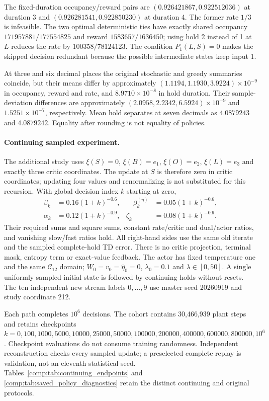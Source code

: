 \documentclass[11pt]{article}
\newcommand{\1}{\mathbf{1}}
\begin{document}
The fixed-duration occupancy/reward pairs are $(0.926421867,0.922512036)$ at duration 3 and $(0.926281541,0.922850230)$ at duration 4. The former rate $1/3$ is infeasible. The two optimal deterministic ties have exactly shared occupancy $171957881/177554825$ and reward $1583657/1636450$; using hold 2 instead of 1 at $L$ reduces the rate by $100358/78124123$. The condition $P_1(L,S)=0$ makes the skipped decision redundant because the possible intermediate states keep input 1.

At three and six decimal places the original stochastic and greedy summaries coincide, but their means differ by approximately $(1.1194,1.1930,3.9224)\times10^{-9}$ in occupancy, reward and rate, and $8.9710\times10^{-8}$ in hold duration. Their sample-deviation differences are approximately $(2.0958,2.2342,6.5924)\times10^{-9}$ and $1.5251\times10^{-7}$, respectively. Mean hold separates at seven decimals as $4.0879243$ and $4.0879242$. Equality after rounding is not equality of policies.

\paragraph{Continuing sampled experiment.}
The additional study uses $\xi(S)=0$, $\xi(B)=e_1$, $\xi(O)=e_2$, $\xi(L)=e_3$ and exactly three critic coordinates. The update at $S$ is therefore zero in critic coordinates; updating four values and renormalizing is not substituted for this recursion. With global decision index $k$ starting at zero,
\[
 \begin{aligned}
 \beta_k&=0.16(1+k)^{-0.6},&\quad \beta_k^{(\eta)}&=0.05(1+k)^{-0.6},\\
 \alpha_k&=0.12(1+k)^{-0.9},& \zeta_k&=0.08(1+k)^{-0.9}.
 \end{aligned}
\]
Their required sums and square sums, constant rate/critic and dual/actor ratios, and vanishing slow/fast ratios hold. All right-hand sides use the same old iterate and the sampled complete-hold TD error. There is no critic projection, terminal mask, entropy term or exact-value feedback. The actor has fixed temperature one and the same $\mathcal C_{12}$ domain; $W_0=v_0=\hat\eta_0=0$, $\lambda_0=0.1$ and $\lambda\in[0,50]$. A single uniformly sampled initial state is followed by continuing holds without resets. The ten independent new stream labels $0,\ldots,9$ use master seed 20260919 and study coordinate 212.

Each path completes $10^6$ decisions. The cohort contains 30,466,939 plant steps and retains checkpoints $k=0,100,1000,5000,10000,25000,50000,100000,200000,400000,600000,800000,10^6$. Checkpoint evaluations do not consume training randomness. Independent reconstruction checks every sampled update; a preselected complete replay is validation, not an eleventh statistical seed. Tables~\ref{comp:tab:continuing_endpoints} and \ref{comp:tab:saved_policy_diagnostics} retain the distinct continuing and original protocols.
\end{document}
